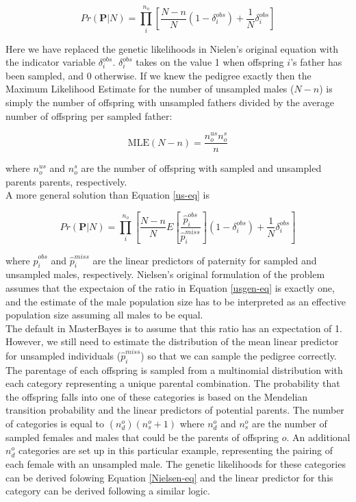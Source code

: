 \documentclass{article}
\begin{document}
\begin{equation}
Pr(\bm{P}|N)  = \prod^{n_{o}}_{i}\left[\frac{N-n}{N}(1-\delta^{obs}_{i})+\frac{1}{N}\delta^{obs}_{i}\right]
\label{us-eq}
\end{equation}

Here we have replaced the genetic likelihoods in Nielen's original equation with the indicator variable $\delta^{obs}_{i}$. $\delta^{obs}_{i}$ takes on the value 1 when offspring $i$'s father has been sampled, and 0 otherwise. If we knew the pedigree exactly then the Maximum Likelihood Estimate for the number of unsampled males ($N-n$) is simply the  number of offspring with unsampled fathers divided by the average number of offspring per sampled father:

\begin{equation}
\textrm{MLE}(N-n) = \frac{n_{o}^{us}n_{o}^{s}}{n}
\end{equation}

where $n_{o}^{us}$ and $n_{o}^{s}$ are the number of offspring with sampled and unsampled parents parents, respectively.\\

A more general solution than Equation \ref{us-eq} is

\begin{equation}
Pr(\bm{P}|N)  = \prod^{n_{o}}_{i}\left[\frac{N-n}{N}E\left[\frac{\hat{p}^{obs}_{i}}{\hat{p}^{miss}_{i}}\right](1-\delta^{obs}_{i})+\frac{1}{N}\delta^{obs}_{i}\right]
\label{usgen-eq}
\end{equation}

where $\hat{p}^{obs}_{i}$ and $\hat{p}^{miss}_{i}$ are the linear predictors of paternity for sampled and unsampled males, respectively.  Nielsen's original formulation of the problem assumes that the expectaion of the ratio in Equation \ref{usgen-eq} is exactly one, and the estimate of the male population size has to be interpreted as an effective population size assuming all males to be equal.\\

The default in MasterBayes is to assume that this ratio has an expectation of 1.  However, we still need to estimate the distribution of the mean linear predictor for unsampled individuals ($\hat{p}^{miss}_{i}$) so that we can sample the pedigree correctly.\\

The parentage of each offspring is sampled from a multinomial distribution with each category representing a unique parental combination.  The probability that the offspring falls into one of these categories is based on the Mendelian transition probability and the linear predictors of potential parents.  The number of categories is equal to $(n^{o}_{d})(n^{o}_{s}+1)$ where $n^{o}_{d}$ and $n^{o}_{s}$ are the number of sampled females and males that could be the parents of offspring $o$.  An additional $n^{o}_{d}$ categories are set up in this particular example, representing the pairing of each female with an unsampled male.  The genetic likelihoods for these categories can be derived folowing Equation \ref{Nielsen-eq} and the linear predictor for this category can be derived following a similar logic.\\   
\end{document}
